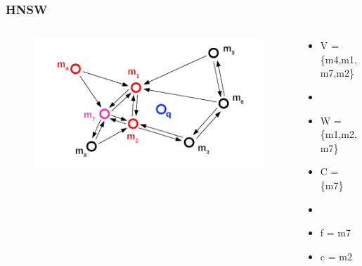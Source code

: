 \documentclass{beamer}
\begin{document}
	\begin{frame}
		\frametitle{HNSW}
		\begin{columns}[T] %
			\begin{column}{.6\textwidth}
				\begin{figure}
					\includegraphics[scale=0.3]{figures/HNSW_b7.png}
				\end{figure}
			\end{column}%
			\hfill%
			\begin{column}{.4\textwidth}
				\begin{itemize}
					\item V = \{m4,m1,m7,m2\}
					\item[]
					\item W = \{m1,m2,m7\}
					\item C = \{m7\}
					\item[]
					\item f = m7
					\item c = m2
				\end{itemize}
			\end{column}%
		\end{columns}
	\end{frame}
\end{document}
